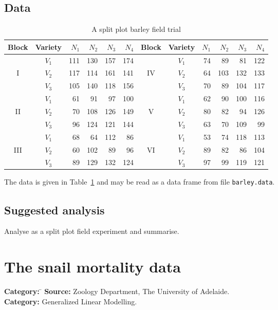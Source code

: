 \documentclass{article}
\newcommand{\strutt}{\vrule height 2.5ex depth 0.5ex width 0ex}%
\newcommand{\code}[1]{\texttt{#1}}
\begin{document}
\subsection*{Data}

\begin{table}[ht]
\begin{center}
\begin{tabular}{@{\protect\strutt}|c|c|rrrr||c|c|rrrr|}
\hline
Block & Variety & $N_1$ & $N_2$ & $N_3$ & $N_4$ &
Block & Variety & $N_1$ & $N_2$ & $N_3$ & $N_4$ \\
\hline
       & $V_1$ &   111  &  130  &  157  &  174  &
       & $V_1$ &    74  &   89  &   81  &  122  \\
  I    & $V_2$ &   117  &  114  &  161  &  141  &
 IV    & $V_2$ &    64  &  103  &  132  &  133  \\
       & $V_3$ &   105  &  140  &  118  &  156  &
       & $V_3$ &    70  &   89  &  104  &  117  \\
\hline
       & $V_1$ &    61  &   91  &   97  &  100  &
       & $V_1$ &    62  &   90  &  100  &  116  \\
 II    & $V_2$ &    70  &  108  &  126  &  149  &
  V    & $V_2$ &    80  &   82  &   94  &  126  \\
       & $V_3$ &    96  &  124  &  121  &  144  &
       & $V_3$ &    63  &   70  &  109  &   99  \\
\hline
       & $V_1$ &    68  &   64  &  112  &   86  &
       & $V_1$ &    53  &   74  &  118  &  113  \\
III    & $V_2$ &    60  &  102  &   89  &   96  &
 VI    & $V_2$ &    89  &   82  &   86  &  104  \\
       & $V_3$ &    89  &  129  &  132  &  124  &
       & $V_3$ &    97  &   99  &  119  &  121  \\
\hline
\end{tabular}
\caption{\label{barley} A split plot barley field trial}
\end{center}
\end{table}
The data is given in Table~\ref{barley} and may be read as a data frame from
file \code{barley.data}.

\subsection*{Suggested analysis}
Analyse as a split plot field experiment and summarise.


\clearpage\section{The snail mortality data}
\begin{tabbing}
\textbf{Category:} \= \kill
\textbf{Source:} \> Zoology Department, The University of Adelaide.\\
\textbf{Category:} \> Generalized Linear Modelling.
\end{tabbing}
\end{document}
